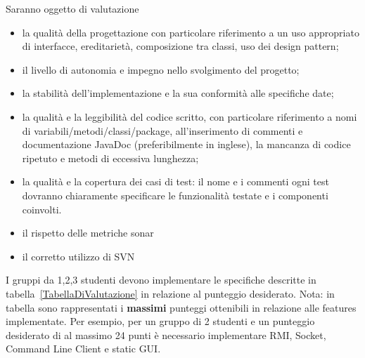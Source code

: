 \documentclass{article}
\begin{document}
Saranno oggetto di valutazione
\begin{itemize}
\item la qualit\` a della progettazione con particolare riferimento a un uso appropriato di interfacce, ereditariet\`a, composizione tra classi, uso dei design pattern;
\item il livello di autonomia e impegno nello svolgimento del progetto;
\item la stabilit\` a dell'implementazione e la sua conformit\` a alle specifiche date;
\item la qualit\` a e la leggibilit\` a del codice scritto, con particolare riferimento a nomi di variabili/metodi/classi/package, all'inserimento di commenti e documentazione JavaDoc (preferibilmente in inglese), la mancanza di codice ripetuto e metodi di eccessiva lunghezza;
\item la qualit\` a e la copertura dei casi di test: il nome e i commenti ogni test dovranno chiaramente specificare le funzionalit\` a testate e i componenti
 coinvolti.
 \item il rispetto delle metriche sonar
 \item il corretto utilizzo di SVN 
\end{itemize}

I gruppi da 1,2,3 studenti devono implementare  le specifiche descritte in tabella~\ref{TabellaDiValutazione} in relazione al punteggio desiderato. Nota: in tabella sono rappresentati i \textbf{massimi} punteggi ottenibili in relazione alle features implementate. Per esempio, per un gruppo di 2 studenti e un punteggio desiderato di al massimo 24 punti \`e necessario implementare RMI, Socket, Command Line Client e static GUI.
\end{document}
